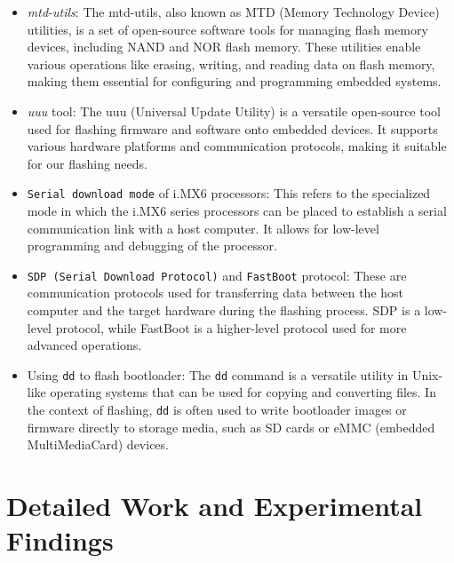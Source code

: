 \begin{itemize}
	\item \textit{mtd-utils}: The mtd-utils, also known as MTD (Memory Technology Device) utilities, is a set of open-source software tools for managing flash memory devices, including NAND and NOR flash memory. These utilities enable various operations like erasing, writing, and reading data on flash memory, making them essential for configuring and programming embedded systems.
	\item \textit{uuu} tool: The uuu (Universal Update Utility) is a versatile open-source tool used for flashing firmware and software onto embedded devices. It supports various hardware platforms and communication protocols, making it suitable for our flashing needs.
	\item \texttt{Serial download mode} of i.MX6 processors: This refers to the specialized mode in which the i.MX6 series processors can be placed to establish a serial communication link with a host computer. It allows for low-level programming and debugging of the processor.
	\item \texttt{SDP (Serial Download Protocol)} and \texttt{FastBoot} protocol: These are communication protocols used for transferring data between the host computer and the target hardware during the flashing process. SDP is a low-level protocol, while FastBoot is a higher-level protocol used for more advanced operations.
	\item Using \texttt{dd} to flash bootloader: The \texttt{dd} command is a versatile utility in Unix-like operating systems that can be used for copying and converting files. In the context of flashing, \texttt{dd} is often used to write bootloader images or firmware directly to storage media, such as SD cards or eMMC (embedded MultiMediaCard) devices.
\end{itemize}



\section*{Detailed Work and Experimental Findings}

